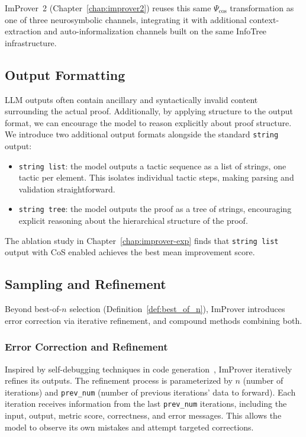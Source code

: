 ImProver~2 (Chapter~\ref{chap:improver2}) reuses this same $\Psi_{\text{cos}}$ transformation as one of three neurosymbolic channels, integrating it with additional context-extraction and auto-informalization channels built on the same InfoTree infrastructure.

\subsection{Output Formatting}
\label{ssec:output_fmt}

LLM outputs often contain ancillary and syntactically invalid content surrounding the actual proof. Additionally, by applying structure to the output format, we can encourage the model to reason explicitly about proof structure. We introduce two additional output formats alongside the standard \texttt{string} output:

\begin{itemize}
    \item \texttt{string list}: the model outputs a tactic sequence as a list of strings, one tactic per element. This isolates individual tactic steps, making parsing and validation straightforward.
    \item \texttt{string tree}: the model outputs the proof as a tree of strings, encouraging explicit reasoning about the hierarchical structure of the proof.
\end{itemize}
The ablation study in Chapter~\ref{chap:improver-exp} finds that \texttt{string list} output with CoS enabled achieves the best mean improvement score.

\subsection{Sampling and Refinement}
\label{ssec:sampling}

Beyond best-of-$n$ selection (Definition~\ref{def:best_of_n}), ImProver introduces error correction via iterative refinement, and compound methods combining both.

\subsubsection{Error Correction and Refinement}

Inspired by self-debugging techniques in code generation~\cite{madaan2023selfrefine,chen2023teachinglargelanguagemodels}, ImProver iteratively refines its outputs. The refinement process is parameterized by $n$ (number of iterations) and \texttt{prev\_num} (number of previous iterations' data to forward). Each iteration receives information from the last \texttt{prev\_num} iterations, including the input, output, metric score, correctness, and error messages. This allows the model to observe its own mistakes and attempt targeted corrections.

